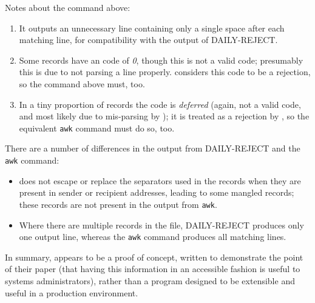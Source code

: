 Notes about the command above:

\begin{enumerate}

    \item It outputs an unnecessary line containing only a single space
        after each matching line, for compatibility with the output of
        DAILY-REJECT\@.

    \item Some records have an \SMTP{} code of \textit{0}, though this is
        not a valid \SMTP{} code; presumably this is due to \LMA{} not
        parsing a line properly.  \LMA{} considers this code to be a
        rejection, so the command above must, too.

    \item In a tiny proportion of records the \SMTP{} code is
        \textit{deferred\/} (again, not a valid code, and most likely due
        to mis-parsing by \LMA{}); it is treated as a rejection by \LMA{},
        so the equivalent \texttt{awk} command must do so, too.

\end{enumerate}

There are a number of differences in the output from DAILY-REJECT and the
\texttt{awk} command:

\begin{itemize}

    \item \LMA{} does not escape or replace the separators used in the
        \CSV{} records when they are present in sender or recipient
        addresses, leading to some mangled records; these records are not
        present in the output from \texttt{awk}.

    \item Where there are multiple records in the \CSV{} file, DAILY-REJECT
        produces only one output line, whereas the \texttt{awk} command
        produces all matching lines.

\end{itemize}

In summary, \LMA{} appears to be a proof of concept, written to demonstrate
the point of their paper (that having this information in an accessible
fashion is useful to systems administrators), rather than a program
designed to be extensible and useful in a production environment.

